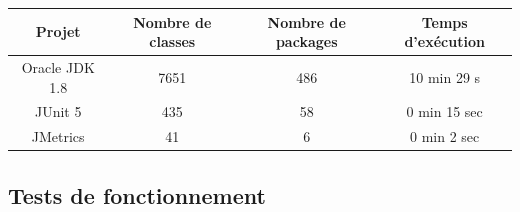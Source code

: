 \documentclass{scrartcl}
\begin{document}
    \begin{center}
        \label{tab:testPerf}
        \begin{tabular}{|c|c|c|c|}\hline
            Projet & Nombre de classes & Nombre de packages & Temps d'exécution \\ \hline
            Oracle JDK 1.8 & 7651 & 486 & 10 min 29 s \\ \hline
            JUnit 5 & 435 & 58 & 0 min 15 sec \\ \hline
            JMetrics & 41 & 6 & 0 min 2 sec \\ \hline
        \end{tabular}
    \end{center}


\subsection{Tests de fonctionnement}
\end{document}
